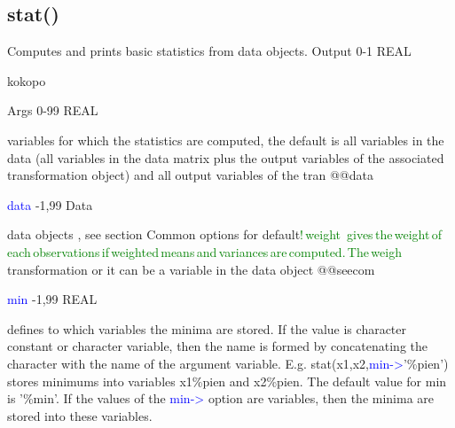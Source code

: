 \subsection{\textcolor{VioletRed}{stat}()}
\label{stat}
Computes and prints basic statistics from data objects.
\vspace{0.3cm}
\hline
\vspace{0.3cm}
\noindent Output \tabto{3cm} 0-1 \tabto{5cm}  REAL \tabto{7cm}
\begin{changemargin}{3cm}{0cm}
\noindent  kokopo
\end{changemargin}
\vspace{0.3cm}
\hline
\vspace{0.3cm}
\noindent Args  \tabto{3cm}  0-99 \tabto{5cm}  REAL \tabto{7cm}
\begin{changemargin}{3cm}{0cm}
\noindent variables for which the statistics are computed,
the default is all variables in the data (all variables in the data matrix plus the output variables of the associated transformation object) and all output variables of the tran
@@data
\end{changemargin}
\vspace{0.3cm}
\hline
\vspace{0.3cm}
\noindent \textcolor{blue}{data}  \tabto{3cm}  -1,99  \tabto{5cm}   Data  \tabto{7cm}
\begin{changemargin}{3cm}{0cm}
\noindent 	data objects , see section Common options for default\textcolor{green}{!\,weight\,	gives\,the\,weight\,of\,each\,observations\,if\,weighted\,means\,and\,variances\,are\,computed.\,The\,weigh}
transformation or it can be a variable in the data object
@@seecom
\end{changemargin}
\vspace{0.3cm}
\hline
\vspace{0.3cm}
\noindent \textcolor{blue}{min}  \tabto{3cm}  -1,99 \tabto{5cm}  REAL \tabto{7cm}
\begin{changemargin}{3cm}{0cm}
\noindent 	defines to which variables the minima are stored.
If the value is character constant or character variable,
then the name is formed by concatenating the character with the name of the argument
variable. E.g. \textcolor{VioletRed}{stat}(x1,x2,\textcolor{blue}{min->}'\%pien') stores minimums into variables
x1\%pien and x2\%pien. The default value for min  is '\%min'.
If the values of the \textcolor{blue}{min->} option are variables,
then the minima are stored into these variables.
\end{changemargin}
\vspace{0.3cm}
